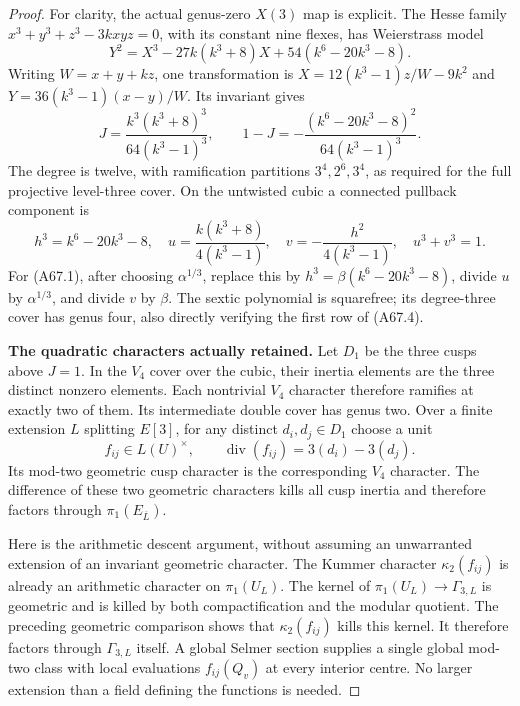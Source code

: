 \begin{proof}
For clarity, the actual genus-zero
$X(3)$ map is explicit. The Hesse family
$x^3+y^3+z^3-3kxyz=0$, with its constant
nine flexes, has Weierstrass model
\[
 Y^2=X^3-27k(k^3+8)X+
                54(k^6-20k^3-8).
\]
Writing $W=x+y+kz$, one transformation
is $X=12(k^3-1)z/W-9k^2$ and
$Y=36(k^3-1)(x-y)/W$. Its invariant gives
\[
 J=\frac{k^3(k^3+8)^3}{64(k^3-1)^3},
 \qquad
 1-J=-\frac{(k^6-20k^3-8)^2}
                       {64(k^3-1)^3}.
 \tag{A67.5}
\]
The degree is twelve, with ramification
partitions $3^4,2^6,3^4$, as required
for the full projective level-three
cover. On the untwisted cubic a connected
pullback component is
\[
 h^3=k^6-20k^3-8,\quad
 u=\frac{k(k^3+8)}{4(k^3-1)},\quad
 v=-\frac{h^2}{4(k^3-1)},\quad u^3+v^3=1.
 \tag{A67.6}
\]
For (A67.1), after choosing
$\alpha^{1/3}$, replace this by
$h^3=\beta(k^6-20k^3-8)$, divide $u$
by $\alpha^{1/3}$, and divide $v$ by
$\beta$. The sextic polynomial is
squarefree; its degree-three cover
has genus four, also directly verifying
the first row of (A67.4).

\par\smallskip\noindent\textbf{The quadratic characters actually retained.}\enspace 
Let $D_1$ be the three cusps above
$J=1$. In the $V_4$ cover over the
cubic, their inertia elements are the
three distinct nonzero elements.
Each nontrivial $V_4$ character therefore
ramifies at exactly two of them. Its
intermediate double cover has genus two.
Over a finite extension $L$ splitting
$E[3]$, for any distinct $d_i,d_j\in D_1$
choose a unit
\[
 f_{ij}\in L(U)^\times,\qquad
       \operatorname{div}(f_{ij})
                     =3(d_i)-3(d_j).
 \tag{A67.7}
\]
Its mod-two geometric cusp character is
the corresponding $V_4$ character.
The difference of these two geometric
characters kills all cusp inertia and
therefore factors through
$\pi_1(E_{\overline L})$.

Here is the arithmetic descent argument,
without assuming an unwarranted extension
of an invariant geometric character.
The Kummer character $\kappa_2(f_{ij})$
is already an arithmetic character on
$\pi_1(U_L)$. The kernel of
$\pi_1(U_L)\to\Gamma_{3,L}$ is geometric
and is killed by both compactification
and the modular quotient. The preceding
geometric comparison shows that
$\kappa_2(f_{ij})$ kills this kernel.
It therefore factors through
$\Gamma_{3,L}$ itself. A global Selmer
section supplies a single global
mod-two class with local evaluations
$f_{ij}(Q_v)$ at every interior centre.
No larger extension than a field
defining the functions is needed.


\end{proof}
